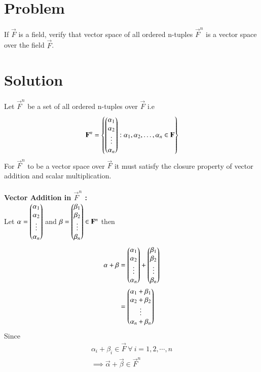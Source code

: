 \documentclass[journal,12pt,twocolumn]{IEEEtran}
\begin{document}
\section{Problem}
If $\vec{F}$ is a field, verify that vector space of all ordered n-tuples $\vec{F}^n$ is a 
vector space over the field $\vec{F}$.
\section{Solution}
Let $\vec{F}^n$ be a set of all ordered n-tuples over $\vec{F}$ i.e
\begin{align}
	\mathbf{F}^n= \left\{\begin{pmatrix}\alpha_1 \\ \alpha_2 \\ \vdots \\ \alpha_n\end{pmatrix} : 
	\alpha_1, \alpha_2, \ldots, \alpha_n \in \mathbf{F} \right\}
\end{align}
For $\vec{F}^n$ to be a vector space over $\vec{F}$ it must satisfy the 
closure property of vector addition and scalar multiplication. \\
\\
{\bf Vector Addition in $\vec{F}^n$ :} \\
Let $\mathbf{\alpha} = \begin{pmatrix}\alpha_1\\ \alpha_2\\ \vdots\\ \alpha_n\end{pmatrix}$ and
$\mathbf{\beta} = \begin{pmatrix}\beta_1\\ \beta_2\\ \vdots\\ \beta_n\end{pmatrix} \in \mathbf{F}^n$ 
then 
\begin{align}
	\mathbf{\alpha} + \mathbf{\beta} 
	&=\begin{pmatrix}\alpha_1\\ \alpha_2\\ \vdots\\ \alpha_n\end{pmatrix}
	+\begin{pmatrix}\beta_1\\ \beta_2\\ \vdots\\ \beta_n\end{pmatrix} \\
	&=\begin{pmatrix}\alpha_1+\beta_1\\ \alpha_2+\beta_2\\ \vdots\\ \alpha_n+\beta_n\end{pmatrix} 
\end{align}
Since 
\begin{align}
	\alpha_i+\beta_i \in \vec{F} \ \forall \  i=1,2,\cdots,n \\
	\implies \vec{\alpha}+\vec{\beta} \in \vec{F}^n
\end{align}
\end{document}
